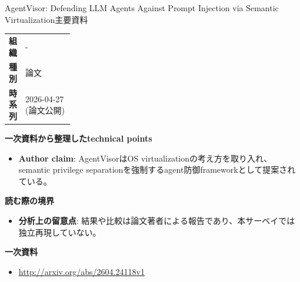 \begin{technicalnote}{AgentVisor: Defending LLM Agents Against Prompt Injection via Semantic Virtualization}{主要資料}
\begingroup
\begin{tabularx}{\linewidth}{@{}>{\bfseries}p{0.22\linewidth}X@{}}
組織 & - \\
種別 & 論文 \\
時系列 & 2026-04-27 (論文公開) \\
\end{tabularx}
\smallskip
{\bfseries 一次資料から整理したtechnical points}
\begin{itemize}[leftmargin=1.5em,itemsep=0.35em]
\item \textbf{Author claim}: AgentVisorはOS virtualizationの考え方を取り入れ、semantic privilege separationを強制するagent防御frameworkとして提案されている。
\end{itemize}
\begin{minipage}{\linewidth}
{\bfseries 読む際の境界}
\begin{itemize}[leftmargin=1.5em,itemsep=0.35em]
\item \textbf{分析上の留意点}: 結果や比較は論文著者による報告であり、本サーベイでは独立再現していない。
\end{itemize}
\begin{samepage}
{\bfseries 一次資料}
\begingroup\sloppy
\begin{itemize}[leftmargin=1.5em,itemsep=0.25em]
\item {\scriptsize\url{http://arxiv.org/abs/2604.24118v1}}
\end{itemize}
\endgroup
\end{samepage}
\end{minipage}
\endgroup
\end{technicalnote}
\medskip

